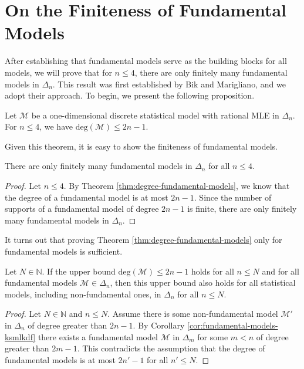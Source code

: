 \section{On the Finiteness of Fundamental Models}

After establishing that fundamental models serve as the building blocks for all models, we will prove that for \( n \leq 4 \), there are only finitely many fundamental models in \( \Delta_n \). This result was first established by Bik and Marigliano, and we adopt their approach. To begin, we present the following proposition.

\begin{theorem}\label{thm:degree-fundamental-models}
    Let \( \mathcal{M} \) be a one-dimensional discrete statistical model with rational MLE in \( \Delta_n \). For \(n \leq 4 \), we have \( \mathrm{deg}(\mathcal{M}) \leq 2n - 1\).
\end{theorem}

Given this theorem, it is easy to show the finiteness of fundamental models.

\begin{theorem}\label{thm:finiteness-fundamental-models}
    There are only finitely many fundamental models in \( \Delta_n \) for all \( n \leq 4 \).
\end{theorem}

\begin{proof}
    Let \( n \leq 4 \).
    By Theorem \ref{thm:degree-fundamental-models}, we know that the degree of a fundamental model is at most \( 2n - 1 \). Since the number of supports of a fundamental model of degree \( 2n - 1 \) is finite, there are only finitely many fundamental models in \( \Delta_n \).
\end{proof}

It turns out that proving Theorem \ref{thm:degree-fundamental-models} only for fundamental models is sufficient.

\begin{theorem}\label{thm:degree-fundamental-models-reduced}    
    Let \( N \in \mathbb{N} \). If the upper bound \( \mathrm{deg}(\mathcal{M}) \leq 2n - 1 \) holds for all \( n \leq N \) and for all fundamental models \( \mathcal{M} \in \Delta_n \), then this upper bound also holds for all statistical models, including non-fundamental ones, in \( \Delta_n \) for all \( n \leq N \).
\end{theorem}

\begin{proof}
    Let $N \in \mathbb{N}$ and $n \leq N$.
    Assume there is some non-fundamental model $\mathcal{M}'$ in $\Delta_n$ of degree greater than $2n - 1$. By Corollary \ref{cor:fundamental-models-ksmlkdf} there exists a fundamental model $\mathcal{M}$ in $\Delta_m$ for some $m < n$ of degree greater than $2m - 1$. This contradicts the assumption that the degree of fundamental models is at most $2n' - 1$ for all $n' \leq N$.
\end{proof}

